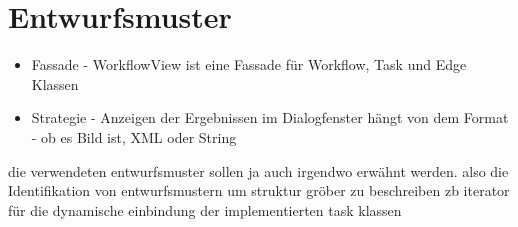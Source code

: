         	\subsubsection{}
	
	\section{Entwurfsmuster}
	
	\begin{itemize}
	    \item Fassade - WorkflowView ist eine Fassade für Workflow, Task und Edge Klassen
	    \item Strategie - Anzeigen der Ergebnissen im Dialogfenster hängt von dem Format - ob es Bild ist, XML oder String 
	\end{itemize}
	
	die verwendeten entwurfsmuster sollen ja auch irgendwo erwähnt werden.
	also die Identifikation von entwurfsmustern um struktur gröber zu beschreiben
	zb iterator für die dynamische einbindung der implementierten task klassen
